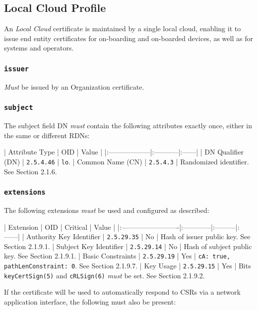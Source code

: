 \subsection{Local Cloud Profile}

An \textit{Local Cloud} certificate is maintained by a single local cloud, enabling it to issue end entity certificates for on-boarding and on-boarded devices, as well as for systems and operators.

\subsubsection{\texttt{issuer}}

\textit{Must} be issued by an Organization certificate.

\subsubsection{\texttt{subject}}

The subject field DN \textit{must} contain the following attributes exactly once, either in the same or different RDNs:

| Attribute Type    | OID        | Value |
|:------------------|:-----------|:------|
| DN Qualifier (DN) | \texttt{2.5.4.46} | \texttt{lo}.
| Common Name (CN)  | \texttt{2.5.4.3}  |  Randomized identifier. See Section 2.1.6.

\subsubsection{\texttt{extensions}}

The following extensions \textit{must} be used and configured as described:

| Extension                | OID         | Critical | Value |
|:-------------------------|:------------|:---------|:------|
| Authority Key Identifier | \texttt{2.5.29.35} | No       | Hash of issuer public key. See Section 2.1.9.1.
| Subject Key Identifier   | \texttt{2.5.29.14} | No       | Hash of subject public key. See Section 2.1.9.1.
| Basic Constraints        | \texttt{2.5.29.19} | Yes      | \texttt{cA: true, pathLenConstraint: 0}. See Section 2.1.9.7.
| Key Usage                | \texttt{2.5.29.15} | Yes      | Bits \texttt{keyCertSign(5)} and \texttt{cRLSign(6)} \textit{must} be set. See Section 2.1.9.2.

If the certificate will be used to automatically respond to CSRs via a network application interface, the following must also be present:

